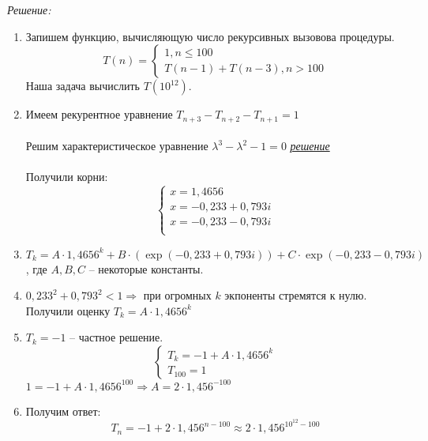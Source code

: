 \documentclass[11pt]{article}
\begin{document}
   {\itshape Решение:}
   \\
   \begin{enumerate}
   	\item Запишем функцию, вычисляющую число рекурсивных вызовова процедуры.
   		\[T(n) = \begin{cases}
   	1, n\le100\\
   	T(n-1) + T(n-3), n>100
   	\end{cases}
   	\]
   	Наша задача вычислить $T(10^{12})$.
   	\item Имеем рекурентное уравнение $T_{n+3} - T_{n+2} - T_{n+1} = 1$\\\\
   	Решим характеристическое уравнение $\lambda^3  - \lambda^2 - 1=0$  {\href{https://www.wolframalpha.com/input/?i=x%5E3+-+x%5E2+-+1%3D+0}{ {\itshape решение}}}
   		\\\\	Получили корни:
   				\[\begin{cases}
x = 1,4656 \\
x = -0,233 + 0,793i\\				
x = -0,233 - 0,793i\\
   	\end{cases}
	\]
	\item $T_k = A\cdot 1,4656^k + B \cdot (\exp(-0,233 + 0,793i)) + C \cdot \exp (-0,233 - 0,793i)$, где $A,B,C$ -- некоторые константы.
	\item $0,233^2 + 0,793^2 < 1 \Rightarrow$ при огромных $k$ экпоненты стремятся к нулю.\\
	Получили оценку $T_k = A\cdot 1,4656^k$
	\item $T_k = -1$ -- частное решение.
	   				\[\begin{cases}
T_k = -1 + A\cdot 1,4656^k\\
T_{100} = 1
	\end{cases}\]
	$1 = -1 + A\cdot 1,4656^{100} \Rightarrow A = 2 \cdot 1,456^{-100}$
	\item Получим ответ:
	\[T_n = -1 + 2\cdot 1,456^{n-100} \approx 2\cdot 1,456^{10^{12}-100}\]
   \end{enumerate}
   	
\end{document}
